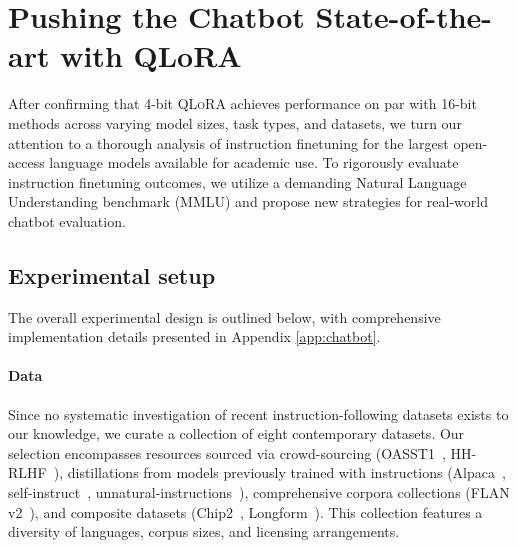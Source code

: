 \section{Pushing the Chatbot State-of-the-art with QLoRA}
\label{sec:pushing}
After confirming that 4-bit \textsc{QLoRA} achieves performance on par with 16-bit methods across varying model sizes, task types, and datasets, we turn our attention to a thorough analysis of instruction finetuning for the largest open-access language models available for academic use. To rigorously evaluate instruction finetuning outcomes, we utilize a demanding Natural Language Understanding benchmark (MMLU) and propose new strategies for real-world chatbot evaluation.

\subsection{Experimental setup} The overall experimental design is outlined below, with comprehensive implementation details presented in Appendix \ref{app:chatbot}.

\paragraph{Data} Since no systematic investigation of recent instruction-following datasets exists to our knowledge, we curate a collection of eight contemporary datasets. Our selection encompasses resources sourced via crowd-sourcing (OASST1~\citep{kopf2023openassistant}, HH-RLHF~\citep{bai2022training}), distillations from models previously trained with instructions (Alpaca~\citep{alpaca}, self-instruct~\citep{wang2022self}, unnatural-instructions~\citep{honovich2022unnatural}), comprehensive corpora collections (FLAN v2~\citep{chung2022scaling}), and composite datasets (Chip2~\citep{laion2023}, Longform~\citep{koksal2023longform}). This collection features a diversity of languages, corpus sizes, and licensing arrangements.

